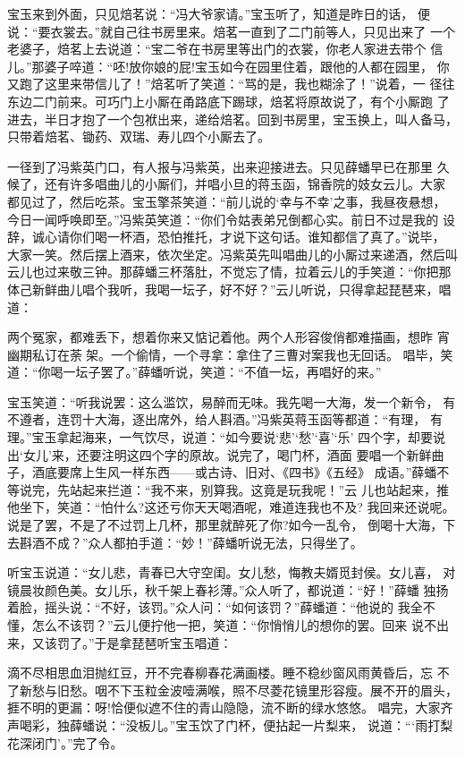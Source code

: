 宝玉来到外面，只见焙茗说：“冯大爷家请。”宝玉听了，知道是昨日的话，
便说：“要衣裳去。”就自己往书房里来。焙茗一直到了二门前等人，只见出来了
一个老婆子，焙茗上去说道：“宝二爷在书房里等出门的衣裳，你老人家进去带个
信儿。”那婆子啐道：“呸!放你娘的屁!宝玉如今在园里住着，跟他的人都在园里，
你又跑了这里来带信儿了！”焙茗听了笑道：“骂的是，我也糊涂了！”说着，一
径往东边二门前来。可巧门上小厮在甬路底下踢球，焙茗将原故说了，有个小厮跑
了进去，半日才抱了一个包袱出来，递给焙茗。回到书房里，宝玉换上，叫人备马，
只带着焙茗、锄药、双瑞、寿儿四个小厮去了。

一径到了冯紫英门口，有人报与冯紫英，出来迎接进去。只见薛蟠早已在那里
久候了，还有许多唱曲儿的小厮们，并唱小旦的蒋玉函，锦香院的妓女云儿。大家
都见过了，然后吃茶。宝玉擎茶笑道：“前儿说的‘幸与不幸’之事，我昼夜悬想，
今日一闻呼唤即至。”冯紫英笑道：“你们令姑表弟兄倒都心实。前日不过是我的
设辞，诚心请你们喝一杯酒，恐怕推托，才说下这句话。谁知都信了真了。”说毕，
大家一笑。然后摆上酒来，依次坐定。冯紫英先叫唱曲儿的小厮过来递酒，然后叫
云儿也过来敬三钟。那薛蟠三杯落肚，不觉忘了情，拉着云儿的手笑道：“你把那
体己新鲜曲儿唱个我听，我喝一坛子，好不好？”云儿听说，只得拿起琵琶来，唱
道：

两个冤家，都难丢下，想着你来又惦记着他。两个人形容俊俏都难描画，想昨
宵幽期私订在荼架。一个偷情，一个寻拿：拿住了三曹对案我也无回话。
唱毕，笑道：“你喝一坛子罢了。”薛蟠听说，笑道：“不值一坛，再唱好的来。”

宝玉笑道：“听我说罢：这么滥饮，易醉而无味。我先喝一大海，发一个新令，
有不遵者，连罚十大海，逐出席外，给人斟酒。”冯紫英蒋玉函等都道：“有理，
有理。”宝玉拿起海来，一气饮尽，说道：“如今要说‘悲’‘愁’‘喜’‘乐’
四个字，却要说出‘女儿’来，还要注明这四个字的原故。说完了，喝门杯，酒面
要唱一个新鲜曲子，酒底要席上生风一样东西——或古诗、旧对、《四书》《五经》
成语。”薛蟠不等说完，先站起来拦道：“我不来，别算我。这竟是玩我呢！”云
儿也站起来，推他坐下，笑道：“怕什么?这还亏你天天喝酒呢，难道连我也不及?
我回来还说呢。说是了罢，不是了不过罚上几杯，那里就醉死了你?如今一乱令，
倒喝十大海，下去斟酒不成？”众人都拍手道：“妙！”薛蟠听说无法，只得坐了。

听宝玉说道：“女儿悲，青春已大守空闺。女儿愁，悔教夫婿觅封侯。女儿喜，
对镜晨妆颜色美。女儿乐，秋千架上春衫薄。”众人听了，都说道：“好！”薛蟠
独扬着脸，摇头说：“不好，该罚。”众人问：“如何该罚？”薛蟠道：“他说的
我全不懂，怎么不该罚？”云儿便拧他一把，笑道：“你悄悄儿的想你的罢。回来
说不出来，又该罚了。”于是拿琵琶听宝玉唱道：

滴不尽相思血泪抛红豆，开不完春柳春花满画楼。睡不稳纱窗风雨黄昏后，忘
不了新愁与旧愁。咽不下玉粒金波噎满喉，照不尽菱花镜里形容瘦。展不开的眉头，
捱不明的更漏：呀!恰便似遮不住的青山隐隐，流不断的绿水悠悠。
唱完，大家齐声喝彩，独薛蟠说：“没板儿。”宝玉饮了门杯，便拈起一片梨来，
说道：“‘雨打梨花深闭门’。”完了令。

